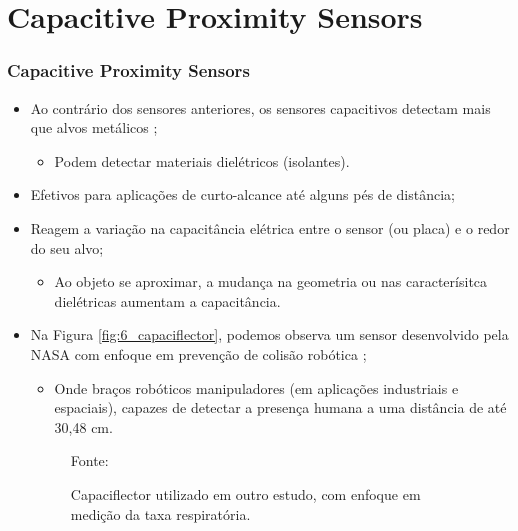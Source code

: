 \documentclass[xcolor=dvipsnames, aspectratio=169]{beamer}
\begin{document}
\section[Capacitive Proximity Sensors]{Capacitive Proximity Sensors} 
\begin{frame}
\frametitle{Capacitive Proximity Sensors}
	\begin{itemize}
		\item Ao contrário dos sensores anteriores, os sensores capacitivos detectam mais que alvos metálicos \cite{everett1995sensors};
		\begin{itemize}
			\item Podem detectar materiais dielétricos (isolantes).
		\end{itemize}
		\item Efetivos para aplicações de curto-alcance até alguns pés de distância;
		\item Reagem a variação na capacitância elétrica entre o sensor (ou placa) e o redor do seu alvo;
		\begin{itemize}
			\item Ao objeto se aproximar, a mudança na geometria ou nas caracterísitca dielétricas aumentam a capacitância.
		\end{itemize}
		\item Na Figura \autoref{fig:6_capaciflector}, podemos observa um sensor desenvolvido pela NASA com enfoque em prevenção de colisão robótica \cite{everett1995sensors};
		\begin{itemize}
			\item Onde braços robóticos manipuladores (em aplicações industriais e espaciais), capazes de detectar a presença humana a uma distância de até 30,48 cm.		\end{itemize}
		\begin{figure}
			\centering
			{Fonte: \cite{hayward2022capaciflector}}
			\caption{Capaciflector utilizado em outro estudo, com enfoque em medição da taxa respiratória.}
			\label{fig:6_capaciflector}
		\end{figure}
	\end{itemize}
\end{frame}
\end{document}
